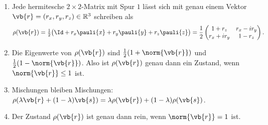\begin{proposition}\label{c02.prop.bloch}
  \begin{enumerate}
    \item Jede hermitesche $2\times 2$-Matrix mit Spur $1$ lässt sich mit genau einem
      Vektor $\vb{r} = (r_x, r_y, r_z) \in \mathbb{R}^3$ schreiben als
      \begin{equation}\label{c02.eq.bloch}
        \rho(\vb{r}) = \tfrac12\bigl(\Id + r_x \pauli{x} + r_y \pauli{y} + r_z \pauli{z}\bigr)
        = \frac12 \begin{pmatrix} 1 + r_z & r_x - i r_y \\ r_x + i r_y & 1 - r_z \end{pmatrix} .
      \end{equation}
    \item Die Eigenwerte von $\rho(\vb{r})$ sind $\tfrac12(1 + \norm{\vb{r}})$ und
      $\tfrac12(1 - \norm{\vb{r}})$. Also ist $\rho(\vb{r})$ genau dann ein Zustand, wenn
      $\norm{\vb{r}} \leq 1$ ist.
    \item Mischungen bleiben Mischungen:
      $\rho(\lambda \vb{r} + (1-\lambda)\vb{s}) = \lambda \rho(\vb{r}) + (1-\lambda)\rho(\vb{s})$.
    \item Der Zustand $\rho(\vb{r})$ ist genau dann rein, wenn $\norm{\vb{r}} = 1$ ist.
  \end{enumerate}
\end{proposition}
